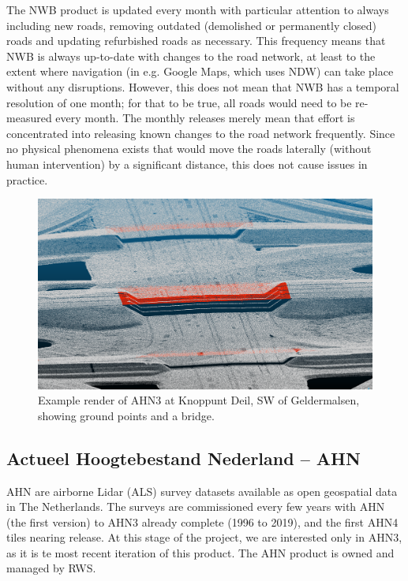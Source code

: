 The NWB product is updated every month with particular attention to always including new roads, removing outdated (demolished or permanently closed) roads and updating refurbished roads as necessary. This frequency means that NWB is always up-to-date with changes to the road network, at least to the extent where navigation (in e.g. Google Maps, which uses NDW) can take place without any disruptions. However, this does not mean that NWB has a temporal resolution of one month; for that to be true, all roads would need to be re-measured every month. The monthly releases merely mean that effort is concentrated into releasing known changes to the road network frequently. Since no physical phenomena exists that would move the roads laterally (without human intervention) by a significant distance, this does not cause issues in practice.

\begin{figure}[ht]
    \centering
    \includegraphics[width=\linewidth]{final_report/figs/ahn_sample_01.png} 
    \caption{Example render of AHN3 at Knoppunt Deil, SW of Geldermalsen, showing ground points and a bridge.}
    \label{fig:ahnbridges}
\end{figure}

\subsection{Actueel Hoogtebestand Nederland – AHN}
\label{sub:ahn}

AHN are airborne Lidar (ALS) survey datasets available as open geospatial data in The Netherlands. The surveys are commissioned every few years with AHN (the first version) to AHN3 already complete (1996 to 2019), and the first AHN4 tiles nearing release. At this stage of the project, we are interested only in AHN3, as it is te most recent iteration of this product. The AHN product is owned and managed by RWS.

